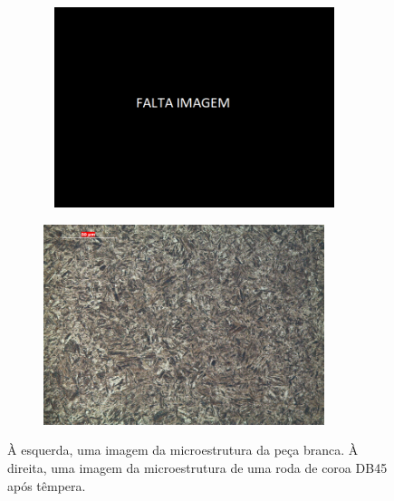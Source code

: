 \begin{figure}[htb]
    \centering
    \begin{subfigure}{.5\textwidth}\
        \centering
        \includegraphics[width = 0.9\textwidth]{Figures/Cap3/Falta_Imagem.png}
        \caption{}
        \label{fig:microestrutura_diametro_serie}
    \end{subfigure}%
    \begin{subfigure}{.5\textwidth}
        \centering
        \includegraphics[width = 0.9\textwidth]{Figures/Cap3/Microestrutura_serie.png}
        \caption{}
        \label{fig:imagem_diametro_serie}
    \end{subfigure}
    \caption[Microestrutura e perfil do diâmetro interno.]%
    {À esquerda, uma imagem da microestrutura da peça branca. À direita, uma imagem da microestrutura de uma roda de coroa DB45 após têmpera.}
\end{figure}
